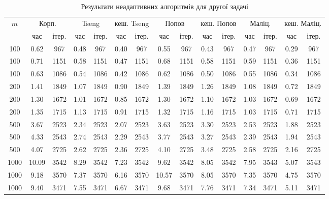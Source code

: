 \begin{table}[H]
    \centering
    \begin{tabular}{||c||c|c||c|c|c|c||c|c|c|c||c|c|c|c||} \hline \hline
        \multirow{2}{*}{$m$} & \multicolumn{2}{c||}{Корп.} & \multicolumn{2}{c|}{Tseng} & \multicolumn{2}{c||}{кеш. Tseng} & \multicolumn{2}{c|}{Попов} & \multicolumn{2}{c||}{кеш. Попов} & \multicolumn{2}{c|}{Маліц.} & \multicolumn{2}{c||}{кеш. Маліц.} \\ \cline{2-15}
         & час & ітер. & час & ітер. & час & ітер. & час & ітер. & час & ітер. & час & ітер. & час & ітер. \\ \hline \hline
        100 & 0.62 & 967 & 0.48 & 967 & 0.40 & 967 & 0.55 & 967 & 0.43 & 967 & 0.47 & 967 & 0.29 & 967 \\ \hline
        100 & 0.71 & 1151 & 0.58 & 1151 & 0.47 & 1151 & 0.68 & 1151 & 0.58 & 1151 & 0.59 & 1151 & 0.36 & 1151 \\ \hline
        100 & 0.63 & 1086 & 0.54 & 1086 & 0.42 & 1086 & 0.62 & 1086 & 0.50 & 1086 & 0.55 & 1086 & 0.34 & 1086 \\ \hline
        200 & 1.41 & 1849 & 1.07 & 1849 & 0.90 & 1849 & 1.39 & 1849 & 1.26 & 1849 & 1.08 & 1849 & 0.72 & 1849 \\ \hline
        200 & 1.30 & 1672 & 1.01 & 1672 & 0.85 & 1672 & 1.30 & 1672 & 1.10 & 1672 & 1.03 & 1672 & 0.69 & 1672 \\ \hline
        200 & 1.35 & 1715 & 1.13 & 1715 & 0.91 & 1715 & 1.32 & 1715 & 1.16 & 1715 & 1.03 & 1715 & 0.71 & 1715 \\ \hline
        500 & 3.67 & 2523 & 2.34 & 2523 & 2.07 & 2523 & 3.63 & 2523 & 3.30 & 2523 & 2.53 & 2523 & 1.88 & 2523 \\ \hline
        500 & 4.33 & 2543 & 2.74 & 2543 & 2.29 & 2543 & 3.77 & 2543 & 3.27 & 2543 & 2.39 & 2543 & 1.94 & 2543 \\ \hline
        500 & 4.07 & 2725 & 2.62 & 2725 & 2.36 & 2725 & 4.10 & 2725 & 3.48 & 2725 & 2.58 & 2725 & 2.16 & 2725 \\ \hline 
        1000 & 10.09 & 3542 & 8.29 & 3542 & 7.23 & 3542 & 9.62 & 3542 & 8.05 & 3542 & 7.95 & 3543 & 5.07 & 3543 \\ \hline
        1000 & 9.18 & 3570 & 7.37 & 3570 & 6.16 & 3570 & 10.57 & 3570 & 8.05 & 3570 & 7.35 & 3570 & 4.75 & 3570 \\ \hline
        1000 & 9.40 & 3471 & 7.55 & 3471 & 6.67 & 3471 & 9.68 & 3471 & 7.76 & 3471 & 7.34 & 3471 & 5.11 & 3471 \\ \hline
        \hline
    \end{tabular}
    \caption{Результати неадаптивних алгоритмів для другої задачі}
    \label{tab:2}
\end{table}
